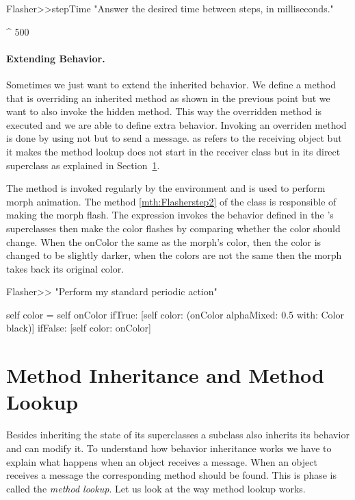 \begin{method}
Flasher>>stepTime
   "Answer the desired time between steps, in milliseconds."

   ^ 500
\end{method}

\paragraph{Extending Behavior.} Sometimes we just want to extend the inherited behavior. We define a method that is overriding an inherited method as shown in the previous point but we want to also invoke the hidden method. 
This way the overridden method is executed and we are able to define extra behavior. Invoking an overriden method is done by using not  but  to send a message.  as  refers to the receiving object but it makes the method lookup does not start in the receiver class but in its direct superclass as explained in Section~\ref{sec:lookup}.

 The method  is invoked regularly by the \sq environment and is used to perform morph animation. The method  \ref{mth:Flasherstep2} of the class  
is responsible of making the morph flash. The expression  invokes the  behavior defined in the 's superclasses then make the color flashes by comparing whether the color should change. When the onColor the same as the morph's color, then the color is changed to be slightly darker, when the colors are not the same then the morph takes back its original color.

\begin{method}\label{mth:Flasherstep2}
Flasher>>
   "Perform my standard periodic action"

   self color = self onColor
      ifTrue: [self color: (onColor alphaMixed: 0.5 with: Color black)]
      ifFalse: [self color: onColor]
 \end{method}



\section{Method Inheritance and Method Lookup}\label{sec:lookup}
Besides inheriting the state of its superclasses a subclass also inherits its behavior and can modify it. To understand how behavior inheritance works we have to explain what happens when an object receives a message. When an object receives a message the corresponding method should be found. This is phase is called the \emph{method lookup}. Let us look at the way  method lookup works.

